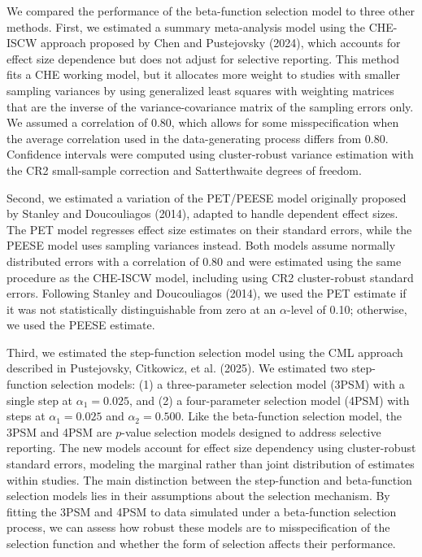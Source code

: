 \documentclass[
  american,
  man, donotrepeattitle,floatsintext]{apa7}
\begin{document}
We compared the performance of the beta-function selection model to three other methods. First, we estimated a summary meta-analysis model using the CHE-ISCW approach proposed by Chen and Pustejovsky (2024), which accounts for effect size dependence but does not adjust for selective reporting. This method fits a CHE working model, but it allocates more weight to studies with smaller sampling variances by using generalized least squares with weighting matrices that are the inverse of the variance-covariance matrix of the sampling errors only. We assumed a correlation of 0.80, which allows for some misspecification when the average correlation used in the data-generating process differs from 0.80. Confidence intervals were computed using cluster-robust variance estimation with the CR2 small-sample correction and Satterthwaite degrees of freedom.

Second, we estimated a variation of the PET/PEESE model originally proposed by Stanley and Doucouliagos (2014), adapted to handle dependent effect sizes. The PET model regresses effect size estimates on their standard errors, while the PEESE model uses sampling variances instead. Both models assume normally distributed errors with a correlation of 0.80 and were estimated using the same procedure as the CHE-ISCW model, including using CR2 cluster-robust standard errors. Following Stanley and Doucouliagos (2014), we used the PET estimate if it was not statistically distinguishable from zero at an \(\alpha\)-level of 0.10; otherwise, we used the PEESE estimate.

Third, we estimated the step-function selection model using the CML approach described in Pustejovsky, Citkowicz, et al. (2025). We estimated two step-function selection models: (1) a three-parameter selection model (3PSM) with a single step at \(\alpha_1 = 0.025\), and (2) a four-parameter selection model (4PSM) with steps at \(\alpha_1 = 0.025\) and \(\alpha_2 = 0.500\). Like the beta-function selection model, the 3PSM and 4PSM are \(p\)-value selection models designed to address selective reporting. The new models account for effect size dependency using cluster-robust standard errors, modeling the marginal rather than joint distribution of estimates within studies. The main distinction between the step-function and beta-function selection models lies in their assumptions about the selection mechanism. By fitting the 3PSM and 4PSM to data simulated under a beta-function selection process, we can assess how robust these models are to misspecification of the selection function and whether the form of selection affects their performance.
\end{document}
